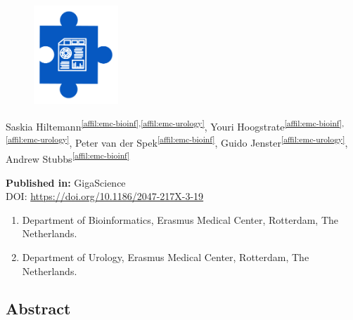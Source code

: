 \setcounter{NAT@ctr}{-1}

\chapter*{}
{}

\begin{figure}[t!]
\centering
\includegraphics[height=10em]{frontmatter/images/chapter-header-ireport.png}
\end{figure}
\vspace{-4cm}

Saskia Hiltemann\textsuperscript{\ref{affil:emc-bioinf},\ref{affil:emc-urology}},
Youri Hoogstrate\textsuperscript{\ref{affil:emc-bioinf},\ref{affil:emc-urology}},
Peter van der Spek\textsuperscript{\ref{affil:emc-bioinf}},
Guido Jenster\textsuperscript{\ref{affil:emc-urology}},
Andrew Stubbs\textsuperscript{\ref{affil:emc-bioinf}}

\textbf{Published in:} GigaScience \\
DOI: \url{https://doi.org/10.1186/2047-217X-3-19}

\small
\begin{enumerate}
\itemsep-0.5em
\item Department of Bioinformatics, Erasmus Medical Center, Rotterdam, The Netherlands. \label{affil:emc-bioinf}
\item Department of Urology, Erasmus Medical Center, Rotterdam, The Netherlands. \label{affil:emc-urology}
\end{enumerate}
\normalsize



\section*{Abstract}

